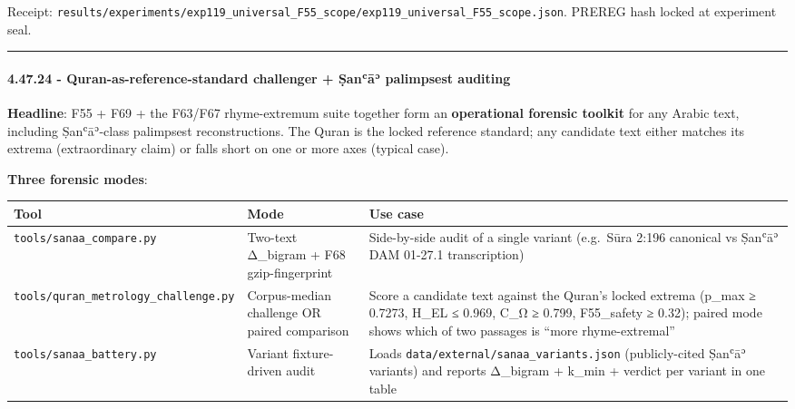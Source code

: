 \documentclass[
]{article}
\newcounter{none} %
\begin{document}
Receipt:
\texttt{results/experiments/exp119\_universal\_F55\_scope/exp119\_universal\_F55\_scope.json}.
PREREG hash locked at experiment seal.

\begin{center}\rule{0.5\linewidth}{0.5pt}\end{center}

\paragraph{4.47.24 - Quran-as-reference-standard challenger + Ṣanʿāʾ
palimpsest
auditing}\label{quran-as-reference-standard-challenger-ux1e63anux2bfux101ux2be-palimpsest-auditing}

\textbf{Headline}: F55 + F69 + the F63/F67 rhyme-extremum suite together
form an \textbf{operational forensic toolkit} for any Arabic text,
including Ṣanʿāʾ-class palimpsest reconstructions. The Quran is the
locked reference standard; any candidate text either matches its extrema
(extraordinary claim) or falls short on one or more axes (typical case).

\textbf{Three forensic modes}:

{\def\LTcaptype{none} %
\begin{longtable}[]{@{}
  >{\raggedright\arraybackslash}p{}
  >{\raggedright\arraybackslash}p{}
  >{\raggedright\arraybackslash}p{}@{}}
\toprule\noalign{}
\begin{minipage}[b]{\linewidth}\raggedright
Tool
\end{minipage} & \begin{minipage}[b]{\linewidth}\raggedright
Mode
\end{minipage} & \begin{minipage}[b]{\linewidth}\raggedright
Use case
\end{minipage} \\
\midrule\noalign{}
\endhead
\bottomrule\noalign{}
\endlastfoot
\texttt{tools/sanaa\_compare.py} & Two-text Δ\_bigram + F68
gzip-fingerprint & Side-by-side audit of a single variant (e.g.~Sūra
2:196 canonical vs Ṣanʿāʾ DAM 01-27.1 transcription) \\
\texttt{tools/quran\_metrology\_challenge.py} & Corpus-median challenge
OR paired comparison & Score a candidate text against the Quran's locked
extrema (p\_max ≥ 0.7273, H\_EL ≤ 0.969, C\_Ω ≥ 0.799, F55\_safety ≥
0.32); paired mode shows which of two passages is ``more
rhyme-extremal'' \\
\texttt{tools/sanaa\_battery.py} & Variant fixture-driven audit & Loads
\texttt{data/external/sanaa\_variants.json} (publicly-cited Ṣanʿāʾ
variants) and reports Δ\_bigram + k\_min + verdict per variant in one
table \\
\end{longtable}
}
\end{document}
